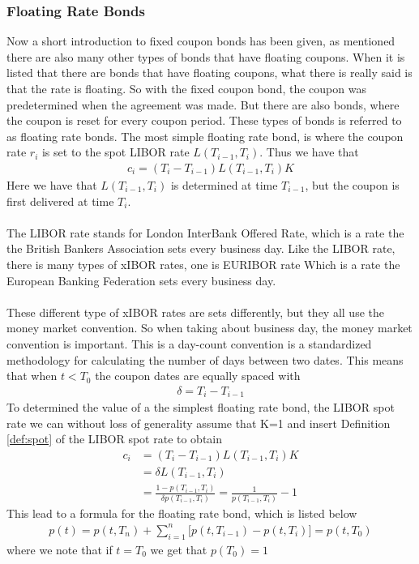 \subsubsection{Floating Rate Bonds}
Now a short introduction to fixed coupon bonds has been given, as mentioned there are also many 
other types of bonds that have floating coupons. When it is listed that there are bonds that have
floating coupons, what there is really said is that the rate is floating. So with the fixed coupon
bond, the coupon was predetermined when the agreement was made. But there are also bonds, where
the coupon is reset for every coupon period. These types of bonds is referred to as floating 
rate bonds. The most simple floating rate bond, is where the coupon rate $r_i$ is set to 
the spot LIBOR rate $L(T_{i-1}, T_i)$. Thus we have that 
\begin{align*}
    c_i = (T_i-T_{i-1})L(T_{i-1},T_i)K
\end{align*}
Here we have that $L(T_{i-1},T_i)$ is determined at time $T_{i-1}$, but the coupon is first 
delivered at time $T_i$. \cite{Bjork}  
\\\\
The LIBOR rate stands for London InterBank Offered Rate, which is a rate the the 
British Bankers Association sets every business day. Like the LIBOR rate, there is many types
of xIBOR rates, one is EURIBOR rate Which is a rate the 
European Banking Federation sets every business day. 
\\\\
These different type of xIBOR rates are sets differently, but they all use the money market convention. 
So when taking about business day, the money market convention is important. This is a day-count 
convention is a standardized methodology for calculating the number of days between two dates.
This means that when $t <T_0$  the coupon dates are equally spaced with  
\begin{align*}
    \delta = T_{i}-T_{i-1}
\end{align*}
To determined the value of a the simplest floating rate bond, the LIBOR spot rate we can without
loss of generality assume that K=1 and insert Definition \ref{def:spot} of the LIBOR spot rate 
to obtain
\begin{align*}
    c_i &= (T_i-T_{i-1})L(T_{i-1},T_i)K \\
        &= \delta L(T_{i-1},T_i) \\
        &= \frac{1- p(T_{i-1},T_i)}{\delta p(T_{i-1},T_i)} = \frac{1}{p(T_{i-1},T_i)}-1
\end{align*}
This lead to a formula for the floating rate bond, which is listed below \cite{Bjork}
\begin{align*}
    p(t)= p(t,T_n) + \sum_{i=1}^{n}\Big[p(t,T_{i-1})-p(t,T_i)\Big] = p(t,T_0)
\end{align*}
where we note that if $t=T_0$ we get that $p(T_0)=1$
